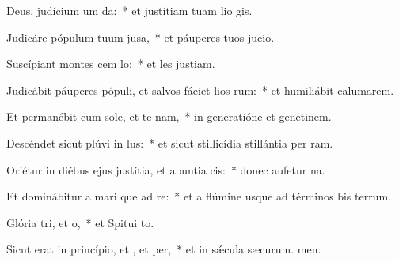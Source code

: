 \item Deus, judícium um  da:~* et justítiam tuam lio gis.
\item Judicáre pópulum tuum  jusa,~* et páuperes tuos  jucio.
\item Suscípiant montes cem lo:~* et les justiam.
\item Judicábit páuperes pópuli, et salvos fáciet lios rum:~* et humiliábit calumarem.
\item Et permanébit cum sole, et te nam,~* in generatióne et genetinem.
\item Descéndet sicut plúvi in lus:~* et sicut stillicídia stillántia per ram.
\item Oriétur in diébus ejus justítia, et abuntia cis:~* donec aufetur na.
\item Et dominábitur a mari que ad re:~* et a flúmine usque ad términos bis terrum.
\item Glória tri, et o,~* et Spitui to.
\item Sicut erat in princípio, et , et per,~* et in sǽcula sæcurum. men.
